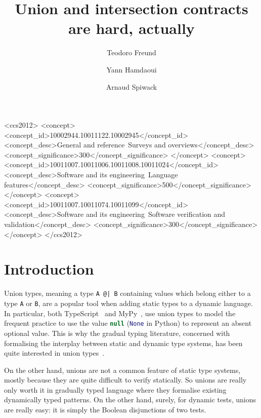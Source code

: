\documentclass[sigplan,10pt]{acmart}
\title{Union and intersection contracts are hard, actually}
\author{Teodoro Freund}
\affiliation{
  \institution{Universidad de Buenos Aires}
  \city{Buenos Aires}
  \country{Argentina}
}
\author{Yann Hamdaoui}
\affiliation{
  \institution{Tweag}
  \city{Paris}
  \country{France}
}
\author{Arnaud Spiwack}
\affiliation{
  \institution{Tweag}
  \city{Paris}
  \country{France}
}
\newcommand{\nickel}[1]{\lstinline[language=nickel]{#1}}
\newcommand{\typescript}[1]{\lstinline[language=JavaScript]{#1}}
\newcommand{\python}[1]{\lstinline[language=Python]{#1}}
\begin{document}
\begin{CCSXML}
<ccs2012>
   <concept>
       <concept_id>10002944.10011122.10002945</concept_id>
       <concept_desc>General and reference~Surveys and overviews</concept_desc>
       <concept_significance>300</concept_significance>
       </concept>
   <concept>
       <concept_id>10011007.10011006.10011008.10011024</concept_id>
       <concept_desc>Software and its engineering~Language features</concept_desc>
       <concept_significance>500</concept_significance>
       </concept>
   <concept>
       <concept_id>10011007.10011074.10011099</concept_id>
       <concept_desc>Software and its engineering~Software verification and validation</concept_desc>
       <concept_significance>300</concept_significance>
       </concept>
 </ccs2012>
\end{CCSXML}



\maketitle

\section{Introduction}
\label{sec:intro}

Union types, meaning a type \nickel{A @| B} containing values which
belong either to a type \nickel{A} or \nickel{B}, are a popular tool
when adding static types to a dynamic language. In particular, both
TypeScript~\cite{TypeScriptUnions} and MyPy~\cite{MyPyOptional}, use
union types to model the frequent practice to use the value
\typescript{null} (\python{None} in Python) to represent an absent
optional value. This is why the gradual typing literature, concerned
with formalising the interplay between static and dynamic type
systems, has been quite interested in union
types~\cite{RootCauseOfBlame,gradualCastagna,ORTIN2011278,ToroTanterGradualUnion,KeilThiemannUnionIntersection}.

On the other hand, unions are not a common feature of static type
systems, mostly because they are quite difficult to verify
statically. So unions are really only worth it in gradually typed
language where they formalise existing dynamically typed patterns. On
the other hand, surely, for dynamic tests, unions are really easy: it
is simply the Boolean disjunctions of two tests.
\end{document}
